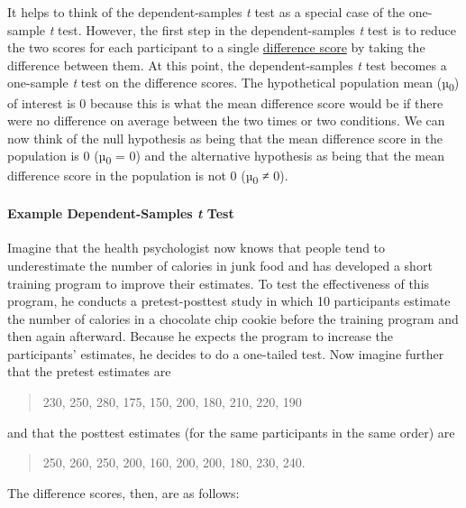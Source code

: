 \documentclass[
]{krantz}
\begin{document}
It helps to think of the dependent-samples \emph{t} test as a special case of the one-sample \emph{t} test. However, the first step in the dependent-samples \emph{t} test is to reduce the two scores for each participant to a single \protect\hyperlink{difference-score}{difference score} by taking the difference between them. At this point, the dependent-samples \emph{t} test becomes a one-sample \emph{t} test on the difference scores. The hypothetical population mean (µ\textsubscript{0}) of interest is 0 because this is what the mean difference score would be if there were no difference on average between the two times or two conditions. We can now think of the null hypothesis as being that the mean difference score in the population is 0 (µ\textsubscript{0} = 0) and the alternative hypothesis as being that the mean difference score in the population is not 0 (µ\textsubscript{0} ≠ 0).

\hypertarget{example-dependent-samples-t-test}{%
\paragraph*{\texorpdfstring{Example Dependent-Samples \emph{t} Test}{Example Dependent-Samples t Test}}\label{example-dependent-samples-t-test}}

Imagine that the health psychologist now knows that people tend to underestimate the number of calories in junk food and has developed a short training program to improve their estimates. To test the effectiveness of this program, he conducts a pretest-posttest study in which 10 participants estimate the number of calories in a chocolate chip cookie before the training program and then again afterward. Because he expects the program to increase the participants' estimates, he decides to do a one-tailed test. Now imagine further that the pretest estimates are

\begin{quote}
230, 250, 280, 175, 150, 200, 180, 210, 220, 190
\end{quote}

and that the posttest estimates (for the same participants in the same order) are

\begin{quote}
250, 260, 250, 200, 160, 200, 200, 180, 230, 240.
\end{quote}

The difference scores, then, are as follows:
\end{document}
